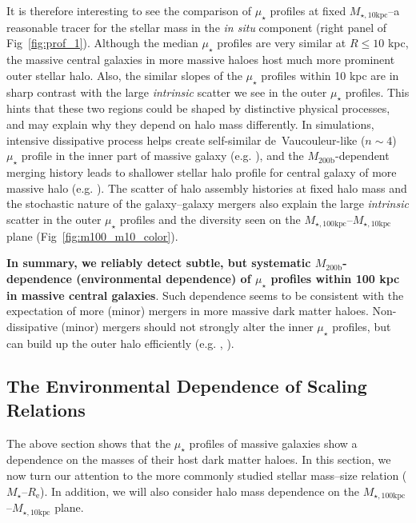 \documentclass[a4paper,fleqn,usenatbib]{mnras}
\def\mstar{{$M_{\star}$}}
\def\mhalo{{$M_{\mathrm{200b}}$}}
\def\minn{{$M_{\star,10\mathrm{kpc}}$}}
\def\mtot{{$M_{\star,100\mathrm{kpc}}$}}
\def\mden{{$\mu_{\star}$}}
\begin{document}
    It is therefore interesting to see the comparison of \mden{} profiles at fixed 
    \minn{}--a reasonable tracer for the stellar mass in the \textit{in situ}
    component (right panel of Fig~\ref{fig:prof_1}).  
    Although the median \mden{} profiles are very similar at $R \leq 10$ kpc, the
    massive central galaxies in more massive haloes host much more prominent outer 
    stellar halo. 
    Also, the similar slopes of the \mden{} profiles within 10 kpc are in sharp 
    contrast with the large \textit{intrinsic} scatter we see in the outer \mden{} 
    profiles. 
    This hints that these two regions could be shaped by distinctive physical 
    processes, and may explain why they depend on halo mass differently.  
    In simulations, intensive dissipative process helps create 
    self-similar de~Vaucouleur-like ($n{\sim} 4$) \mden{} profile in the inner part 
    of massive galaxy (e.g. \citealt{Hopkins2008}), and the \mhalo{}-dependent
    merging history leads to shallower stellar halo profile for central galaxy 
    of more massive halo (e.g. \citealt{Pillepich2014}). 
    The scatter of halo assembly histories at fixed halo mass and the stochastic 
    nature of the galaxy--galaxy mergers also explain the large \textit{intrinsic} 
    scatter in the outer \mden{} profiles and the diversity seen on the 
    \mtot{}--\minn{} plane (Fig~\ref{fig:m100_m10_color}).

    \textbf{In summary, we reliably detect subtle, but systematic \mhalo{}-dependence 
    (environmental dependence) of \mden{} profiles within 100 kpc in massive central 
    galaxies}. 
    Such dependence seems to be consistent with the expectation of more (minor) 
    mergers in more massive dark matter haloes. 
    Non-dissipative (minor) mergers should not strongly alter the inner \mden{} 
    profiles, but can build up the outer halo efficiently
    (e.g. \citealt{Hilz2013}, \citealt{Oogi2013}).
      

\subsection{The Environmental Dependence of Scaling Relations}
    \label{ssec:scaling}
    
    The above section shows that the \mden{} profiles of massive galaxies show a 
    dependence on the masses of their host dark matter haloes. 
    In this section, we now turn our attention to the more commonly studied stellar 
    mass--size relation (\mstar{}--$R_{\mathrm{e}}$). 
    In addition, we will also consider halo mass dependence on the 
    \mtot{}--\minn{} plane. 
    
\end{document}
